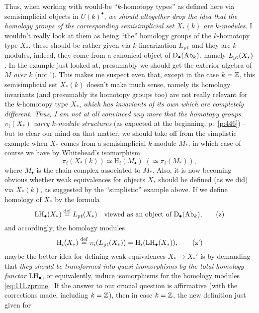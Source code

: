 Thus, when working with would-be ``$k$-homotopy types'' as defined
here via semisimplicial objects in $U(k)^\bullet$, \emph{we should
  altogether drop the idea that the homology groups of the
  corresponding semisimplicial set $X_*(k)$ are $k$-modules}. I
wouldn't really look at them as being ``the'' homology groups of the
$k$-homotopy type $X_*$, these should be rather given via
$k$-linearization $L_{\mathrm{pt}}$ and they are $k$-modules, indeed, they
come from a canonical object of ${\mathrm{D}}_\bullet(\operatorname{Ab}_k)$, namely
$L_{\mathrm{pt}}(X_*)$. In the example just looked at, presumably we should
get the exterior algebra of $M$ \emph{over $k$} (not \bZ!). This makes
me suspect even that, except in the case $k={\mathbb{Z}}$, this semisimplicial
set $X_*(k)$ doesn't make much sense, namely its homology invariants
(and presumably its homotopy groups too) are not really relevant for
the $k$-homotopy type $X_*$, \emph{which has invariants of its own
  which are completely different. Thus, I am not at all convinced any
  more that the homotopy groups $\pi_i(X_*)$ carry $k$-module
  structures} (as expected at the beginning, p.\ \ref{p:446}) -- but
to clear our mind on that matter, we should take off from the
simplistic example when $X_*$ comes from a semisimplicial $k$-module
$M_*$, in which case of course we have by Whitehead's isomorphism
\[\pi_i(X_*(k)) \simeq \mathrm H_i(M_\bullet) \; (\simeq\pi_i(M_*)),\]
where $M_\bullet$ is the chain complex associated to $M_*$. Also, it
is now becoming obvious whether weak equivalences for objects $X_*$
should be defined (as we did) via $X_*(k)$, as suggested by the
``simplistic'' example above. If we define homology of $X_*$ by the
formula
\begin{equation}
  \label{eq:111.z}
  \operatorname{LH}_\bullet(X_*) \overset{\textup{def}}{=} L_{\mathrm{pt}}(X_*)\quad
  \text{viewed as an object of ${\mathrm{D}}_\bullet(\operatorname{Ab}_k)$,}\tag{z}
\end{equation}
and accordingly, the homology modules
\begin{equation}
  \label{eq:111.zprime}
  \mathrm H_i(X_*) \overset{\textup{def}}{=} \pi_i(L_{\mathrm{pt}}(X_*)) = \mathrm
  H_i(\operatorname{LH}_\bullet(X_*)),\tag{z'} 
\end{equation}
maybe the better idea for defining weak equivalences $X_*\to X_*'$ is
by demanding that \emph{they should be transformed into
  quasi-isomorphisms by the total homology functor $\operatorname{LH}_\bullet$}, or
equivalently, induce isomorphisms for the homology modules
\eqref{eq:111.zprime}. If the answer to our crucial question is
affirmative (with the corrections made, including $k={\mathbb{Z}}$),
then in case $k={\mathbb{Z}}$, the new definition just given for
